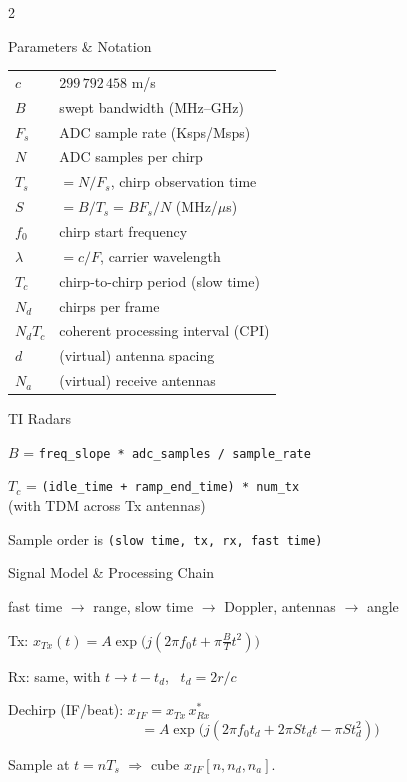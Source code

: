 \small
\setlength{\columnsep}{10pt}
\begin{multicols}{2}

\begin{sectionbox}{Parameters \& Notation}
\setlength{\tabcolsep}{4pt}
\renewcommand{\arraystretch}{1.02}
\begin{tabular}{@{}ll@{}}
$c$ & $299\,792\,458$ m/s \\
$B$ & swept bandwidth (MHz--GHz) \\
$F_s$ & ADC sample rate (Ksps/Msps) \\
$N$ & ADC samples per chirp \\
$T_s$ & $= N/F_s$, chirp observation time \\
$S$ & $= B/T_s = BF_s/N$ (MHz/$\mu$s) \\
$f_0$ & chirp start frequency \\
$\lambda$ & $= c/F$, carrier wavelength \\
$T_c$ & chirp-to-chirp period (slow time) \\
$N_d$ & chirps per frame \\
$N_dT_c$ & coherent processing interval (CPI) \\
$d$ & (virtual) antenna spacing \\
$N_a$ & (virtual) receive antennas \\
\end{tabular}
\end{sectionbox}

\begin{sectionbox}{TI Radars}
\begin{cheatlist}
\item $B$ = \lstinline{freq_slope * adc_samples / sample_rate}
\item $T_c$ = \texttt{(idle\_time + ramp\_end\_time)  * num\_tx} \\ (with TDM across Tx antennas)
\item Sample order is \lstinline{(slow time, tx, rx, fast time)}
\end{cheatlist}
\end{sectionbox}

\begin{sectionbox}{Signal Model \& Processing Chain}
{\centering fast time $\to$ range, slow time $\to$ Doppler, antennas $\to$ angle\par}
\begin{cheatlist}
\item Tx: $x_{Tx}(t) = A\exp\!\big(j(2\pi f_0t + \pi\tfrac{B}{T}t^2)\big)$
\item Rx: same, with $t \to t - t_d$, \ $t_d = 2r/c$
\item Dechirp (IF/beat): $x_{IF} = x_{Tx}\,x_{Rx}^*$
  \[ = A\exp\!\big(j(2\pi f_0t_d + 2\pi S t_d t - \pi S t_d^2)\big) \]
\item Sample at $t = nT_s$ $\Rightarrow$ cube $x_{IF}[n, n_d, n_a]$.
\end{cheatlist}
\vspace{2pt}
\end{sectionbox}


\end{multicols}
